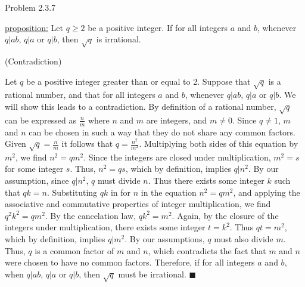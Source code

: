 \documentclass{article}
\theoremstyle{definition}
\begin{document}
	\vspace{1cm}






	\noindent Problem 2.3.7  \vspace{0.3cm}

	\underline{proposition:} Let $q\ge 2$ be a positive integer. If for
	all integers $a$ and $b$, whenever $q|ab$, $q|a$ or $q|b$, then
	$\sqrt{q}$ is irrational.

	\vspace{0.4cm}

	 (Contradiction)

	\vspace{0.2cm} Let $q$ be a positive integer greater than or equal
	to 2. Suppose that $\sqrt{q}$ is a rational number, and that for all
	integers $a$ and $b$, whenever $q|ab$, $q|a$ or $q|b$. We will show
	this leads to a contradiction. By definition of a rational number,
	$\sqrt{q}$ can be expressed as $\frac{n}{m}$ where $n$ and $m$ are
	integers, and $m\not=0$. Since $q\not=1$, $m$ and $n$ can be chosen
	in such a way that they do not share any common factors. Given
	$\sqrt{q}=\frac{n}{m}$ it follows that $q=\frac{n^2}{m^2}$.
	Multiplying both sides of this equation by $m^2$, we find
	$n^2=qm^2$. Since the integers are closed under multiplication,
	$m^2=s$ for some integer $s$. Thus, $n^2=qs$, which by definition,
	implies $q|n^2$. By our assumption, since $q|n^2$, $q$ must divide
	$n$. Thus there exists some integer $k$ such that $qk=n$.
	Substituting $qk$ in for $n$ in the equation $n^2=qm^2$, and
	applying the associative and commutative properties of integer
	multiplication, we find $q^2k^2=qm^2$. By the cancelation law,
	$qk^2=m^2.$  Again, by the closure of the integers under
	multiplication, there exists some integer $t=k^2$. Thus $qt=m^2$,
	which by definition, implies $q|m^2$. By our assumptions, $q$ must
	also divide $m$. Thus, $q$ is a common factor of $m$ and $n$, which
	contradicts the fact that $m$ and $n$ were chosen to have no common
	factors. Therefore, if for all integers $a$ and $b$, when $q|ab$,
	$q|a$ or $q|b$, then $\sqrt{q}$ must be irrational. $\blacksquare$

	\vspace{1cm}

\end{document}
